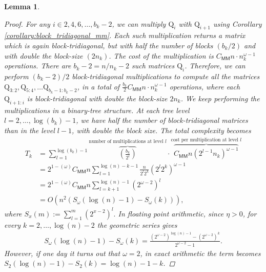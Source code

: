 \documentclass{article}
\newcommand{\lpar}{\left(}
\newcommand{\rpar}{\right)}
\newtheorem{lemma}{Lemma}[section]
\newcommand\matQ{\boldsymbol{\mathrm{Q}}}
\newcommand{\MM}{\mathsf{MM}}
\begin{document}
\begin{lemma}
\begin{proof}
        For any $i\in2,4,6,\ldots ,b_k-2$, we can multiply $\matQ_i$ with $\matQ_{i+1}$ using Corollary \ref{corollary:block_tridiagonal_mm}. 
        Each such multiplication returns a matrix which is again block-tridiagonal, but with half the number of blocks $(b_k/2)$ and with double the block-size $(2n_k)$. 
        The cost of the multiplication is $C_{ \MM}n\cdot n_k^{\omega-1}$ operations. There are $b_k-2=n/n_k-2$ such matrices $\matQ_i$. Therefore, we can perform $(b_k-2)/2$ block-tridiagonal multiplications to compute all the matrices
        $\matQ_{3:2},\matQ_{5:4},\ldots \matQ_{b_k-1:b_k-2}$, in a total of $\tfrac{b_k}{2} C_{ \MM}n\cdot n_k^{\omega-1}$ operations, where each $\matQ_{i+1:i}$ is block-tridiagonal with double the block-size $2n_k$. We keep performing the multiplications in a binary-tree structure. At each tree level $l=2,\ldots,\log(b_k)-1$, we have half the number of block-tridiagonal matrices than in the level $l-1$, with double the block size.  The total complexity becomes
        \begin{align*}
            T_k
            &= 
            \sum_{l=1}^{\log(b_k)-1} 
            \overbrace{
                \lpar \tfrac{b_k}{2^l} \rpar
            }^{
                \text{number of multiplications at level } l
            }
            \cdot
            \overbrace{
                C_{ \MM}n(2^{l-1}n_k)^{\omega-1}
            }^{
                \text{cost per multiplication at level } l
            }
            \\
            &=
            2^{1-(\omega)}
            C_{ \MM}
            n
            \sum_{l=1}^{\log(n)-k-1}
            \tfrac{n}{2^l2^k}
            \lpar
                2^l2^k
            \rpar^{\omega-1}
            \\
            &=
            2^{1-(\omega)}
            C_{ \MM}
            n
            \sum_{l=k+1}^{\log(n)-1}
            (2^{\omega-2})^l
            \\
            &=
            O\lpar
                n^2
                \lpar
                    S_{\omega}(\log(n)-1) - S_{\omega}(k)
                \rpar 
            \rpar,
        \end{align*}
        where $S_{x}(m):=\sum_{l=1}^{m} \lpar 2^{x-2} \rpar^{l}.$ In floating point arithmetic, since $\eta>0$, for every $k=2,\ldots,\log(n)-2$ the geometric series gives
        \begin{align*}
            S_{\omega}(\log(n)-1)-S_{\omega}(k) = \frac{
                (2^{\omega-2})^{\log(n)-1}
                -
                (2^{\omega-2})^k
            }{
                2^{\omega-2}-1
            }.
        \end{align*}
        However, if one day it turns out that $\omega=2$, in exact arithmetic the term becomes $S_2(\log(n)-1)-S_2(k) = \log(n)-1-k$.
        

\end{proof}
\end{lemma}
\end{document}
